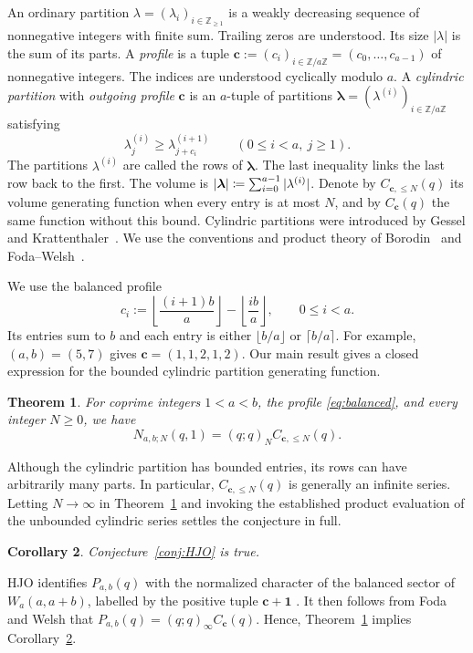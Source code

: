 \documentclass[12pt,reqno]{amsart}
\numberwithin{equation}{section}
\newtheorem{theorem}{Theorem}[section]
\newtheorem{corollary}[theorem]{Corollary}
\theoremstyle{definition}
\theoremstyle{remark}
\theoremstyle{plain}
\newcommand{\ZZ}{\mathbb Z}
\newcommand{\one}{\mathbf1}
\newcommand{\cc}{\mathbf c}
\DeclarePairedDelimiter\abs{\lvert}{\rvert}
\begin{document}
An ordinary partition $\lambda=(\lambda_i)_{i\in \ZZ_{\ge 1}}$ is a weakly decreasing sequence of nonnegative integers with finite sum. Trailing zeros are understood. Its size $|\lambda|$ is the sum of its parts. A {\it profile} is a tuple $\cc:=(c_i)_{i \in \ZZ/a\ZZ}=(c_0,\ldots,c_{a-1})$ of nonnegative integers. The indices are understood cyclically modulo $a$. A {\it cylindric partition} with \emph{outgoing profile} $\cc$ is an $a$-tuple of partitions $\boldsymbol\lambda=(\lambda^{(i)})_{i\in \ZZ/a\ZZ}$ satisfying
\begin{equation}\label{eq:cylinder}
 \lambda^{(i)}_j\ge\lambda^{(i+1)}_{j+c_i}
 \qquad(0\leq i<a,\ j\ge1).
\end{equation}
The partitions $\lambda^{(i)}$ are called the rows of $\boldsymbol\lambda$. The last inequality links the last row back to the first. The volume is $\abs{\boldsymbol{\lambda}}\coloneqq \sum_{i=0}^{a-1}|\lambda^{(i)}|$. Denote by $C_{\cc,\le N}(q)$ its volume generating function when every entry is at most $N$, and by $C_{\cc}(q)$ the same function without this bound. 
Cylindric partitions were introduced by Gessel and Krattenthaler~\cite{GK}.  We use the conventions and product theory of Borodin~\cite[Section~5]{Borodin} and Foda--Welsh~\cite[Sections~2--3]{FW}.

We use the balanced profile
\begin{equation}\label{eq:balanced}
 c_i:=\left\lfloor\frac{(i+1)b}{a}\right\rfloor-
         \left\lfloor\frac{ib}{a}\right\rfloor,
 \qquad0\le i<a.
\end{equation}
Its entries sum to $b$ and each entry is either $\lfloor{b/a}\rfloor$ or $\lceil{b/a}\rceil$. For example, $(a,b)=(5,7)$ gives $\cc=(1,1,2,1,2)$.
Our main result gives a closed expression for the bounded cylindric partition generating function.

\begin{theorem}\label{thm:mainfinite}
For coprime integers $1<a<b$, the profile \eqref{eq:balanced}, and every integer $N\ge0$, we have
\begin{equation}\label{eq:mainfinite}
 N_{a,b;N}(q,1)=(q;q)_N C_{\cc,\le N}(q).
\end{equation}
\end{theorem}

Although the cylindric partition has bounded entries, its rows can have arbitrarily many parts. In particular, $C_{\cc,\le N}(q)$ is generally an infinite series. 
Letting $N\to\infty$ in Theorem~\ref{thm:mainfinite} and invoking the established product evaluation of the unbounded cylindric series settles the conjecture in full.
\begin{corollary}\label{cor:HJO}
 Conjecture~\ref{conj:HJO} is true. 
\end{corollary}
HJO identifies $P_{a,b}(q)$ with the normalized character of the balanced
sector of $W_a(a,a+b)$, labelled by the positive tuple $\cc+\one$
\cite[Proposition~9.3]{HJO}. It then follows from Foda and Welsh \cite[(5), (23), (25), and Sections 3.1–3.3]{FW} that $P_{a,b}(q)=(q;q)_\infty C_\cc(q)$. Hence, Theorem~\ref{thm:mainfinite} implies Corollary~\ref{cor:HJO}.
\end{document}
